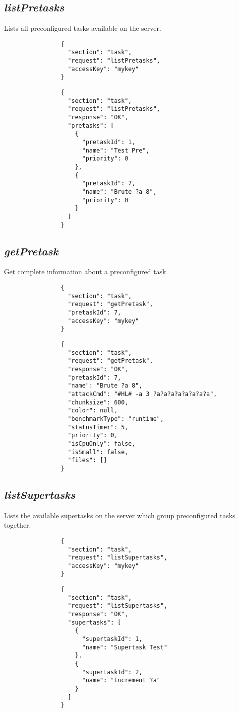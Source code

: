 \documentclass{article}
\begin{document}
		\subsection*{\textit{listPretasks}}
			Lists all preconfigured tasks available on the server.
			{
				\color{blue}
				\begin{verbatim}
				{
				  "section": "task",
				  "request": "listPretasks",
				  "accessKey": "mykey"
				}
				\end{verbatim}
			}
			{
				\color{OliveGreen}
				\begin{verbatim}
				{
				  "section": "task",
				  "request": "listPretasks",
				  "response": "OK",
				  "pretasks": [
				    {
				      "pretaskId": 1,
				      "name": "Test Pre",
				      "priority": 0
				    },
				    {
				      "pretaskId": 7,
				      "name": "Brute ?a 8",
				      "priority": 0
				    }
				  ]
				}
				\end{verbatim}
			}
		\subsection*{\textit{getPretask}}
			Get complete information about a preconfigured task.
			{
				\color{blue}
				\begin{verbatim}
				{
				  "section": "task",
				  "request": "getPretask",
				  "pretaskId": 7,
				  "accessKey": "mykey"
				}
				\end{verbatim}
			}
			{
				\color{OliveGreen}
				\begin{verbatim}
				{
				  "section": "task",
				  "request": "getPretask",
				  "response": "OK",
				  "pretaskId": 7,
				  "name": "Brute ?a 8",
				  "attackCmd": "#HL# -a 3 ?a?a?a?a?a?a?a?a",
				  "chunksize": 600,
				  "color": null,
				  "benchmarkType": "runtime",
				  "statusTimer": 5,
				  "priority": 0,
				  "isCpuOnly": false,
				  "isSmall": false,
				  "files": []
				}
				\end{verbatim}
			}
		\subsection*{\textit{listSupertasks}}
			Lists the available supertasks on the server which group preconfigured tasks together.
			{
				\color{blue}
				\begin{verbatim}
				{
				  "section": "task",
				  "request": "listSupertasks",
				  "accessKey": "mykey"
				}
				\end{verbatim}
			}
			{
				\color{OliveGreen}
				\begin{verbatim}
				{
				  "section": "task",
				  "request": "listSupertasks",
				  "response": "OK",
				  "supertasks": [
				    {
				      "supertaskId": 1,
				      "name": "Supertask Test"
				    },
				    {
				      "supertaskId": 2,
				      "name": "Increment ?a"
				    }
				  ]
				}
				\end{verbatim}
			}
\end{document}

